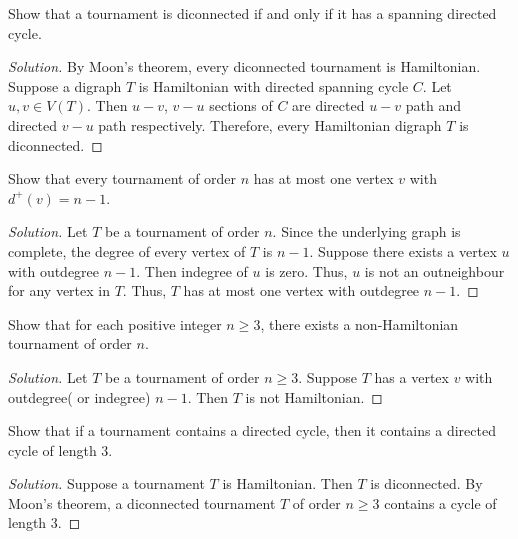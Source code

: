 \begin{exercise}
	Show that a tournament is diconnected if and only if it has a spanning directed cycle.
\end{exercise}
\begin{proof}[Solution]
	By Moon's theorem, every diconnected tournament is Hamiltonian. Suppose a digraph $T$ is Hamiltonian with directed spanning cycle $C$. Let $u,v \in V(T)$. Then $u-v$, $v-u$ sections of $C$ are directed $u-v$ path and directed $v-u$ path respectively. Therefore, every Hamiltonian digraph $T$ is diconnected.
\end{proof}

\begin{exercise}
	Show that every tournament of order $n$ has at most one vertex $v$ with $d^+(v) = n-1$.
\end{exercise}
\begin{proof}[Solution]
	Let $T$ be a tournament of order $n$. Since the underlying graph is complete,  the degree of every vertex of $T$ is $n-1$. Suppose there exists a vertex $u$ with outdegree $n-1$. Then indegree of $u$ is zero. Thus, $u$ is not an outneighbour for any vertex in $T$. Thus, $T$ has at most one vertex with outdegree $n-1$.
\end{proof}

\begin{exercise}
	Show that for each positive integer $n \ge 3$, there exists a non-Hamiltonian tournament of order $n$.
\end{exercise}
\begin{proof}[Solution]
	Let $T$ be a tournament of order $n \ge 3$. Suppose $T$ has a vertex $v$ with outdegree( or indegree) $n-1$. Then $T$ is not Hamiltonian.
\end{proof}

\begin{exercise}
	Show that if a tournament contains a directed cycle, then it contains a directed cycle of length $3$.
\end{exercise}
\begin{proof}[Solution]
	Suppose a tournament $T$ is Hamiltonian. Then $T$ is diconnected. By Moon's theorem, a diconnected tournament $T$ of order $n \ge 3$ contains a cycle of length $3$.
\end{proof}

